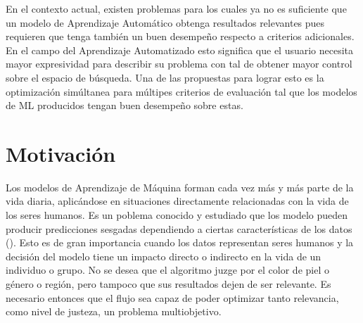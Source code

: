 En el contexto actual, existen problemas para los cuales ya no es suficiente que un modelo de Aprendizaje Autom\'atico obtenga resultados relevantes pues requieren que tenga tambi\'en un buen desempe\~no respecto a criterios adicionales. En el campo del Aprendizaje Automatizado esto significa que el usuario necesita mayor expresividad para describir su problema con tal de obtener mayor control sobre el espacio de b\'usqueda. Una de las propuestas para lograr esto es la optimizaci\'on sim\'ultanea para m\'ultipes criterios de evaluaci\'on  tal que los modelos de ML producidos tengan buen desempeño sobre estas.   


\section*{Motivaci\'on}
%  
Los modelos de Aprendizaje de M\'aquina forman cada vez m\'as y m\'as parte de la vida diaria, aplic\'andose en situaciones directamente  relacionadas con la vida de los seres humanos. Es un poblema conocido y estudiado que los modelo pueden producir predicciones sesgadas dependiendo a ciertas caracter\'isticas de los datos (\cite{mehrabi2021survey}). Esto es de gran importancia cuando los datos representan seres humanos y la decisi\'on del modelo tiene un impacto directo o indirecto en la vida de un individuo o grupo. No se desea que el algoritmo juzge por el color de piel o g\'enero o regi\'on, pero tampoco que sus resultados dejen de ser relevante. Es necesario entonces que el flujo sea capaz de poder optimizar tanto  relevancia, como  nivel de justeza, un problema multiobjetivo.

